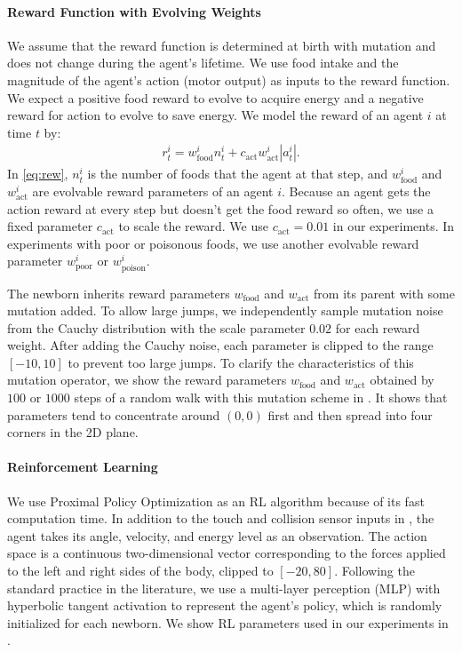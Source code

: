 \paragraph{Reward Function with Evolving Weights}
We assume that the reward function is determined at birth with mutation and does not change during the agent's lifetime. We use food intake and the magnitude of the agent's action (motor output) as inputs to the reward function. We expect a positive food reward to evolve to acquire energy and a negative reward for action to evolve to save energy.
We model the reward of an agent $i$ at time $t$ by:
\begin{align}
  r^{i}_{t} = w_{\mathrm{food}}^{i}n_{t}^{i} + c_\mathrm{act} w_{\mathrm{act}}^{i}|a_{t}^{i}|\label{eq:rew}.
\end{align}
In \cref{eq:rew}, $n_{t}^{i}$ is the number of foods that the agent at that step, and $w_{\mathrm{food}}^{i}$ and $w_{\mathrm{act}}^{i}$ are evolvable reward parameters of an agent $i$. Because an agent gets the action reward at every step but doesn't get the food reward so often, we use a fixed parameter $c_\mathrm{act}$ to scale the reward. We use $c_\mathrm{act}=0.01$ in our experiments. In experiments with poor or poisonous foods, we use another evolvable reward parameter $w_{\mathrm{poor}}^{i}$ or $w_{\mathrm{poison}}^{i}$.

The newborn inherits reward parameters $w_{\mathrm{food}}$ and $w_{\mathrm{act}}$ from its parent with some mutation added. To allow large jumps, we independently sample mutation noise from the Cauchy distribution with the scale parameter $0.02$ for each reward weight. After adding the Cauchy noise, each parameter is clipped to the range $[-10, 10]$ to prevent too large jumps. To clarify the characteristics of this mutation operator, we show the reward parameters $w_{\mathrm{food}}$ and $w_{\mathrm{act}}$ obtained by $100$ or $1000$ steps of a random walk with this mutation scheme in . It shows that parameters tend to concentrate around $(0, 0)$ first and then spread into four corners in the 2D plane.

\paragraph{Reinforcement Learning}
We use Proximal Policy Optimization \citep{schulmanProximalPolicyOptimization2017} as an RL algorithm because of its fast computation time. In addition to the touch and collision sensor inputs in , the agent takes its angle, velocity, and energy level as an observation. The action space is a continuous two-dimensional vector corresponding to the forces applied to the left and right sides of the body, clipped to $[-20, 80]$. Following the standard practice in the literature, we use a multi-layer perception (MLP) with hyperbolic tangent activation to represent the agent's policy, which is randomly initialized for each newborn. We show RL parameters used in our experiments in .

